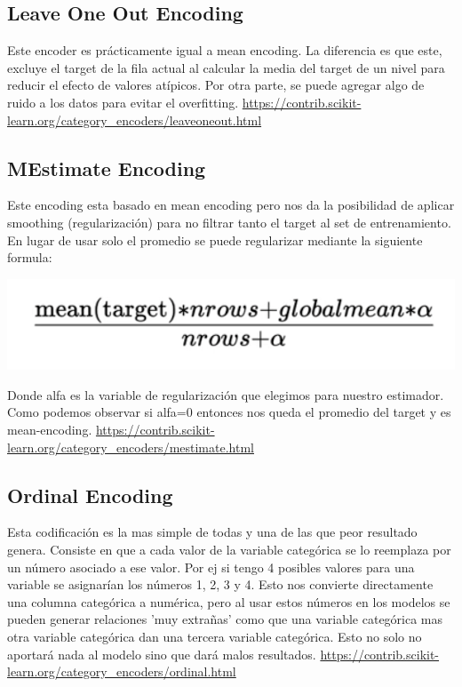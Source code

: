 \documentclass[12pt,a4paper]{article}
\begin{document}
\subsection{Leave One Out Encoding}
Este encoder es prácticamente igual a mean encoding. La diferencia es que este, excluye el target de la fila actual al calcular la media del target de un nivel para reducir el efecto de valores atípicos. \newline
Por otra parte, se puede agregar algo de ruido a los datos para evitar el overfitting. 
\url{https://contrib.scikit-learn.org/category_encoders/leaveoneout.html}

\subsection{MEstimate Encoding}
Este encoding esta basado en mean encoding pero nos da la posibilidad de aplicar smoothing (regularización) para no filtrar tanto el target al set de entrenamiento. En lugar de usar solo el promedio se puede regularizar mediante la siguiente formula:
\begin{center}
    \includegraphics[scale=0.5]{imgs/formula-smoothing.png}
\end{center}
Donde alfa es la variable de regularización que elegimos para nuestro estimador. Como podemos observar si alfa=0 entonces nos queda el promedio del target y es mean-encoding.
\url{https://contrib.scikit-learn.org/category_encoders/mestimate.html}

\subsection{Ordinal Encoding}
Esta codificación es la mas simple de todas y una de las que peor resultado genera. Consiste en que a cada valor de la variable categórica se lo reemplaza por un número asociado a ese valor. Por ej si tengo 4 posibles valores para una variable se asignarían los números 1, 2, 3 y 4.
Esto nos convierte directamente una columna categórica a numérica, pero al usar estos números en los modelos se pueden generar relaciones 'muy extrañas' como que una variable categórica mas otra variable categórica dan una tercera variable categórica. Esto no solo no aportará nada al modelo sino que dará malos resultados.
\url{https://contrib.scikit-learn.org/category_encoders/ordinal.html}
\end{document}
